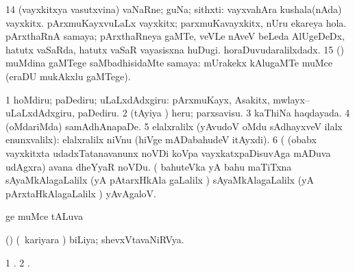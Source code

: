 \eanum
\numie
\num{14} (vayxkitxya vasutxvina) vaNaRne; guNa; sithxti:  vayxvahAra kushala(nAda) vayxkitx.  pArxmuKayxvuLaLx vayxkitx; parxmuKavayxkitx,  nUru ekareya hola.  pArxthaRnA samaya; pArxthaRneya gaMTe, veVLe  nAveV beLeda AlUgeDeDx,  hatutx vaSaRda, hatutx vaSaR vayasisxna huDugi.  horaDuvudaralilxdadx. 
\num{15} (\ame) muMdina gaMTege saMbadhisidaMte samaya:  mUrakekx kAlugaMTe muMce (eraDU mukAkxlu gaMTege). 
\enum
\emng

\noindent
\gl{\pagu}
\bmng
\bnum
\num{1}  hoMdiru; paDediru; uLaLxdAdxgiru:  pArxmuKayx, Asakitx, mwlayx--uLaLxdAdxgiru, paDediru. 
\num{2}  (tAyiya \vi) heru; parxsavisu. 
\num{3}  kaThiNa haqdayada. 
\num{4}  (oMdariMda) samAdhAnapaDe. 
\num{5}  elalxralilx (yAvudoV oMdu sAdhayxveV ilalx enunxvalilx):  elalxralilx niVnu (hiVge mADabahudeV itAyxdi). 
\num{6}  (  (obabx vayxkitxta udadxTatanavanunx noVDi koVpa vayxkatxpaDisuvAga mADuva udAgxra) avana dheYyaR noVDu. 
  (  
\banum
{} bahuteVka yA bahu maTiTxna sAyaMkAlagaLalilx (yA pAtarxHkAla gaLalilx \mo) 
 sAyaMkAlagaLalilx (yA pArxtaHkAlagaLalilx \mo) yAvAgaloV. 
\eanum
\numie
\enum
\emng
\eentry

\bentry
{}
\gl{\pUparx}
\bmng
{} ge muMce  tALuva \rUpa 
\emng
\eentry

\bentry
{}
\gl{\nA}
\bmng
(\ame) (\kanmu\ kariyara \ashi) biLiya; shevxVtavaNiRVya. 
\emng
\eentry

\bentry
{}
\gl{\saMkiSx}
\bmng
\bnum
\num{1} . 
\num{2} . 
\enum
\emng
\eentry

